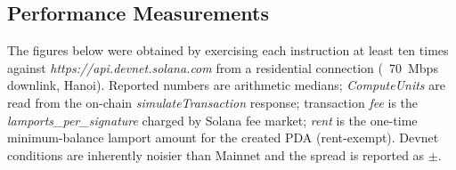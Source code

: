 \subsection{Performance Measurements}
\label{subsection:4.3.1}

The figures below were obtained by exercising each instruction at least ten times against \emph{https://api.devnet.solana.com} from a residential connection (~70~Mbps downlink, Hanoi). Reported numbers are arithmetic medians; \emph{ComputeUnits} are read from the on-chain \emph{simulateTransaction} response; transaction \emph{fee} is the \emph{lamports\_per\_signature} charged by Solana fee market; \emph{rent} is the one-time minimum-balance lamport amount for the created PDA (rent-exempt). Devnet conditions are inherently noisier than Mainnet and the spread is reported as $\pm$.

